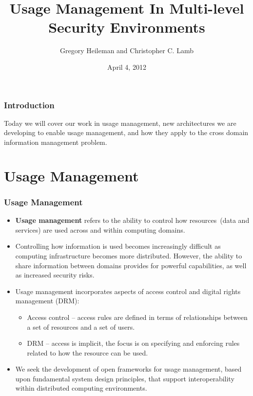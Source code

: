 \documentclass[t,handout, 10pt]{beamer}
\title{Usage Management In Multi-level Security Environments}
\author [Greg, Chris]{Gregory Heileman and Christopher C. Lamb}
\institute[University of New Mexico]{
\inst {}Department of Electrical and Computer Engineering\\
University of New Mexico}
\date{April 4, 2012}
\begin{document}
\begin{frame}
\titlepage
\end{frame}


\begin{frame}
\frametitle{Introduction}
Today we will cover our work in usage management, new architectures we are developing to enable usage management, and how they apply to the cross domain information management problem.
\tableofcontents 
\end{frame}

\section{Usage Management}

\begin{frame}\frametitle{Usage Management}
\begin{itemize}
 \item \textbf{Usage management} refers to the ability to control how resources~(data and services) are used across and within computing domains.
 \pause
 \item Controlling how information is used becomes increasingly difficult as computing infrastructure becomes more distributed.  \pause However, the ability to share information between domains provides for powerful capabilities, as well as increased security risks.
 \pause
 \item Usage management incorporates aspects of access control and digital rights management (DRM):
 \pause
  \begin{itemize}
   \item Access control -- access rules are defined in terms of relationships between a set of resources and a set of users.
  \pause
  \item DRM -- access is implicit, the focus is on specifying and enforcing rules related to how the resource can be used.
  \end{itemize}
  \item We seek the development of open frameworks for usage management, based upon fundamental system design principles, that support interoperability within distributed computing environments. 
\end{itemize}
\end{frame}
\end{document}
